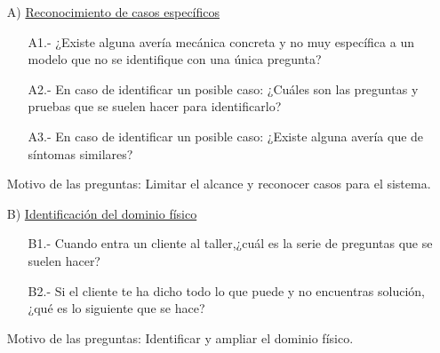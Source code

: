 \documentclass[a4paper,12pt]{article}
\begin{document}
 \begin{itemize}
 \item[A)] \underline{Reconocimiento de casos específicos}
 \begin{itemize}
 \item[A1.-] ¿Existe alguna avería mecánica concreta y no muy específica a un modelo que no se identifique con una única pregunta?
 \item[A2.-] En caso de identificar un posible caso: ¿Cuáles son las preguntas y pruebas que se suelen hacer para identificarlo?
 \item[A3.-] En caso de identificar un posible caso: ¿Existe alguna avería que de síntomas similares?
 \end{itemize}
 Motivo de las preguntas: Limitar el alcance y reconocer casos para el sistema.
 \item[B)] \underline{Identificación del dominio físico}
 \begin{itemize}
 \item[B1.-] Cuando entra un cliente al taller,¿cuál es la serie de preguntas que se suelen hacer?
 \item[B2.-] Si el cliente te ha dicho todo lo que puede y no encuentras solución, ¿qué es lo siguiente que se hace?
 \end{itemize}
 Motivo de las preguntas: Identificar y ampliar el dominio físico.
 \end{itemize}
 
 
\end{document}
